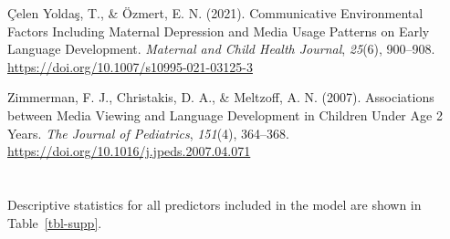 \documentclass[
  man,
  floatsintext,
  longtable,
  nolmodern,
  notxfonts,
  notimes,
  colorlinks=true,linkcolor=blue,citecolor=blue,urlcolor=blue]{apa7}
\newlength{\cslhangindent}
\newenvironment{CSLReferences}[2] %
 {\begin{list}{}{%
  \setlength{\itemindent}{0pt}
  \setlength{\leftmargin}{0pt}
  \setlength{\parsep}{0pt}
  \ifodd #1
   \setlength{\leftmargin}{\cslhangindent}
   \setlength{\itemindent}{-1\cslhangindent}
  \fi
  \setlength{\itemsep}{#2\baselineskip}}}
 {\end{list}}
\begin{document}
\begin{CSLReferences}{1}{0}
Çelen Yoldaş, T., \& Özmert, E. N. (2021). Communicative {Environmental
Factors Including Maternal Depression} and {Media Usage Patterns} on
{Early Language Development}. \emph{Maternal and Child Health Journal},
\emph{25}(6), 900--908. \url{https://doi.org/10.1007/s10995-021-03125-3}

Zimmerman, F. J., Christakis, D. A., \& Meltzoff, A. N. (2007).
Associations between {Media Viewing} and {Language Development} in
{Children Under Age} 2 {Years}. \emph{The Journal of Pediatrics},
\emph{151}(4), 364--368.
\url{https://doi.org/10.1016/j.jpeds.2007.04.071}

\end{CSLReferences}

\appendix

\section{}\label{appendix}

Descriptive statistics for all predictors included in the model are
shown in Table~\ref{tbl-supp}.

\vspace{1em}

\begingroup
\fontsize{8.2pt}{9.9pt}\selectfont
\end{document}

